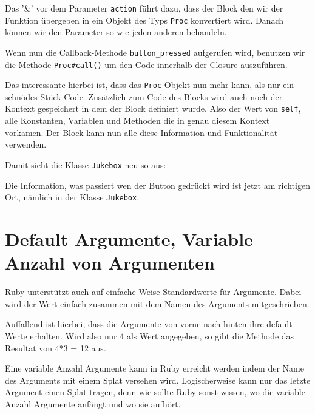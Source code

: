 \documentclass[a4book,11pt,twoside]{scrbook}
\begin{document}


Das '\&' vor dem Parameter \texttt{action} führt dazu, dass der Block den wir der Funktion übergeben in ein Objekt des Typs \texttt{Proc} konvertiert wird. Danach können wir den Parameter so wie jeden anderen behandeln.

Wenn nun die Callback-Methode \texttt{button\_pressed} aufgerufen wird, benutzen wir die Methode \texttt{Proc\#call()} um den Code innerhalb der Closure auszuführen.

Das interessante hierbei ist, dass das \texttt{Proc}-Objekt nun mehr kann, als nur ein schnödes Stück Code. Zusätzlich zum Code des Blocks wird auch noch der Kontext gespeichert in dem der Block definiert wurde. Also der Wert von \texttt{self}, alle Konstanten, Variablen und Methoden die in genau diesem Kontext vorkamen. Der Block kann nun alle diese Information und Funktionalität verwenden.

Damit sieht die Klasse \texttt{Jukebox} neu so aus:



Die Information, was passiert wen der Button gedrückt wird ist jetzt am richtigen Ort, nämlich in der Klasse \texttt{Jukebox}.





\section{Default Argumente, Variable Anzahl von Argumenten}
Ruby unterstützt auch auf einfache Weise Standardwerte für Argumente. Dabei wird der Wert einfach zusammen mit dem Namen des Arguments mitgeschrieben.



Auffallend ist hierbei, dass die Argumente von vorne nach hinten ihre default-Werte erhalten. Wird also nur 4 als Wert angegeben, so gibt die Methode das Resultat von 4*3 = 12 aus.


Eine variable Anzahl Argumente kann in Ruby erreicht werden indem der Name des Arguments mit einem Splat versehen wird. Logischerweise kann nur das letzte Argument einen Splat tragen, denn wie sollte Ruby sonst wissen, wo die variable Anzahl Argumente anfängt und wo sie aufhört.


\end{document}
